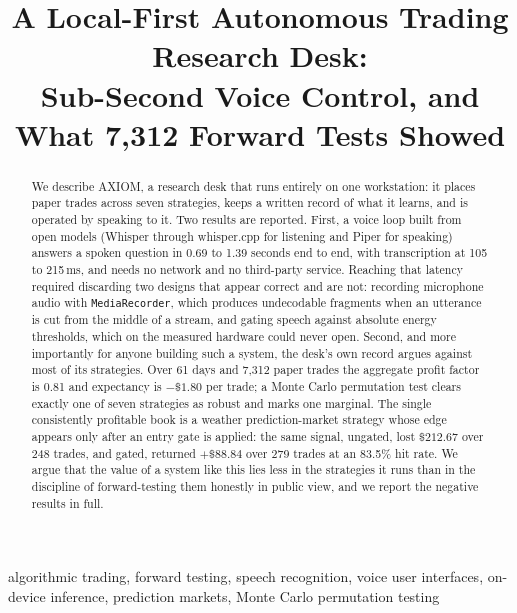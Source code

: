 \documentclass[conference]{IEEEtran}
\begin{document}
\title{A Local-First Autonomous Trading Research Desk:\\
Sub-Second Voice Control, and What 7{,}312 Forward Tests Showed}

\author{
}

\maketitle

\begin{abstract}
We describe AXIOM, a research desk that runs entirely on one workstation: it
places paper trades across seven strategies, keeps a written record of what it
learns, and is operated by speaking to it. Two results are reported. First, a
voice loop built from open models (Whisper through whisper.cpp for listening
and Piper for speaking) answers a spoken question in 0.69 to 1.39 seconds end
to end, with transcription at 105 to 215\,ms, and needs no network and no
third-party service. Reaching that latency required discarding two designs
that appear correct and are not: recording microphone audio with
\texttt{MediaRecorder}, which produces undecodable fragments when an utterance
is cut from the middle of a stream, and gating speech against absolute energy
thresholds, which on the measured hardware could never open. Second, and more
importantly for anyone building such a system, the desk's own record argues
against most of its strategies. Over 61 days and 7{,}312 paper trades the
aggregate profit factor is 0.81 and expectancy is $-\$1.80$ per trade; a Monte
Carlo permutation test clears exactly one of seven strategies as robust and
marks one marginal. The single consistently profitable book is a weather
prediction-market strategy whose edge appears only after an entry gate is
applied: the same signal, ungated, lost $\$212.67$ over 248 trades, and gated,
returned $+\$88.84$ over 279 trades at an 83.5\% hit rate. We argue that the
value of a system like this lies less in the strategies it runs than in the
discipline of forward-testing them honestly in public view, and we report the
negative results in full.
\end{abstract}

\begin{IEEEkeywords}
algorithmic trading, forward testing, speech recognition, voice user
interfaces, on-device inference, prediction markets, Monte Carlo permutation
testing
\end{IEEEkeywords}
\end{document}
